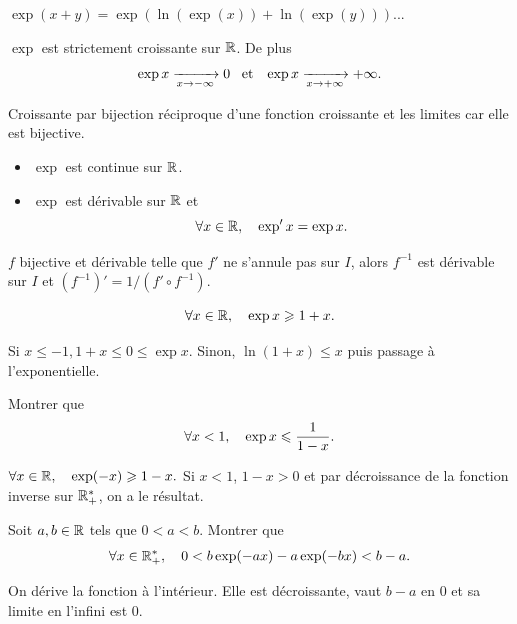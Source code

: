 \documentclass{magnolia}
\begin{document}
\begin{preuve}
$\exp(x+y)=\exp(\ln(\exp(x))+\ln(\exp(y)))$...
\end{preuve}

\begin{proposition}[utile=-3]
$\exp$ est strictement croissante sur $\mathbb{R}$. De plus
\[\exp x\xrightarrow[x\rightarrow -\infty]{} 0 \quad\!\text{et}\quad\! \exp x\xrightarrow[x\rightarrow +\infty]{} +\infty.\]
\end{proposition}

\begin{preuve}
Croissante par bijection réciproque d'une fonction croissante et les limites car elle est bijective.
\end{preuve}


\begin{proposition}[utile=-3]
\begin{itemize}
\item $\exp$ est continue sur $\mathbb{R}$.
\item $\exp$ est dérivable sur $\mathbb{R}$ et
  \[\forall x\in\mathbb{R} ,\quad \exp' x=\exp x.\]
\end{itemize}
\end{proposition}

\begin{preuve}
$f$ bijective et dérivable telle que $f'$ ne s'annule pas sur $I$, alors $f^{-1}$ est dérivable sur $I$ et $(f^{-1})'=1/(f'\circ f^{-1})$.
\end{preuve}

\begin{proposition}[utile=-3]
\[\forall x\in\mathbb{R} ,\quad \exp x \geqslant 1+x.\]
\end{proposition}
\begin{preuve}
Si $x\leq -1, 1+x\leq 0 \leq \exp x$. Sinon, $\ln(1+x)\leq  x$ puis passage à l'exponentielle.
\end{preuve}

\begin{exos}
\exemple Montrer que
  \[\forall x<1 ,\quad \exp x\leqslant\frac{1}{1-x}.\]
  \begin{sol}
  $\forall x\in\mathbb{R} ,\quad \exp (-x) \geqslant 1-x.$ Si $x<1$, $1-x>0$ et par décroissance de la fonction inverse sur $\mathbb{R}_+^*$, on a le résultat.
  \end{sol}
\exemple Soit $a,b\in\mathbb{R}$ tels que $0<a<b$. Montrer que
  \[\forall x\in\mathbb{R}_+^* ,\quad 0<b\exp(-ax)-a\exp(-bx)<b-a.\]
  \begin{sol}
  On dérive la fonction à l'intérieur. Elle est décroissante, vaut $b-a$ en $0$ et sa limite en l'infini est $0$.
  \end{sol}
\end{exos}
\end{document}
